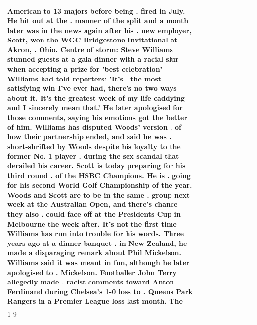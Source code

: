 \begin{table}[H]
\begin{tabular}{lllrlllll}
American to 13 majors before being . fired in July. He hit out at the . manner of the split and a month later was in the news again after his . new employer, Scott, won the WGC Bridgestone Invitational at Akron, . Ohio. Centre of storm: Steve Williams stunned guests at a gala dinner with a racial slur when accepting a prize for 'best celebration' Williams had told reporters: 'It's . the most satisfying win I've ever had, there's no two ways about it. It's the greatest week of my life caddying and I sincerely mean that.' He later apologised for those comments, saying his emotions got the better of him. Williams has disputed Woods' version . of how their partnership ended, and said he was . short-shrifted by Woods despite his loyalty to the former No. 1 player . during the sex scandal that derailed his career. Scott is today preparing for his third round . of the HSBC Champions. He is . going for his second World Golf Championship of the year. Woods and Scott are to be in the same . group next week at the Australian Open, and there's chance they also . could face off at the Presidents Cup in Melbourne the week after. It's not the first time Williams has run into trouble for his words. Three years ago at a dinner banquet . in New Zealand, he made a disparaging remark about Phil Mickelson. Williams said it was meant in fun, although he later apologised to . Mickelson. Footballer John Terry allegedly made . racist comments toward Anton Ferdinand during Chelsea's 1-0 loss to . Queens Park Rangers in a Premier League loss last month. The \\
\cline{1-9}

\end{tabular}
\end{table}
